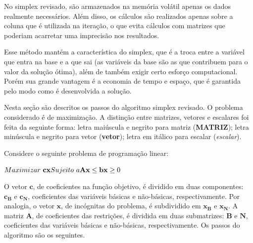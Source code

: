 No simplex revisado, são armazenados na memória volátil apenas os dados realmente necessários. Além disso, os cálculos são realizados apenas sobre a coluna que é utilizada na iteração, o que evita cálculos com matrizes que poderiam acarretar uma imprecisão nos resultados.

Esse método mantém a característica do simplex, que é a troca entre a variável que entra na base e a que sai (as variáveis da base são as que contribuem para o valor da solução ótima), além de também exigir certo esforço computacional. Porém sua grande vantagem é a economia de tempo e espaço, que é garantida pelo modo como é desenvolvida a solução. 

Nesta seção são descritos os passos do algoritmo simplex revisado. O problema considerado é de maximização. A distinção entre matrizes, vetores e escalares foi feita da seguinte forma: letra maiúscula e negrito para matriz (\textbf{MATRIZ}); letra minúscula e negrito para vetor (\textbf{vetor}); letra em itálico para escalar (\textit{escalar}).

Considere o seguinte problema de programação linear:

$\\
Maximizar\ \mathbf{cx} \\
Sujeito\ a \\
\mathbf{Ax} \leq \mathbf{b} \\
\mathbf{x} \geq0$

O vetor $\mathbf{c}$, de coeficientes na função objetivo, é dividido em duas componentes: $\mathbf{c{_B}}$ e $\mathbf{c{_N}}$, coeficientes das variáveis básicas e não-básicas, respectivamente. Por analogia, o vetor $\mathbf{x}$, de incógnitas do problema, é subdividido em $\mathbf{x{_B}}$ e $\mathbf{x{_N}}$.  A matriz $\mathbf{A}$, de coeficientes das restrições, é dividida em duas submatrizes: $\mathbf{B}$ e $\mathbf{N}$, coeficientes das variáveis básicas e não-básicas, respectivamente. Os passos do algoritmo são os seguintes.\\

